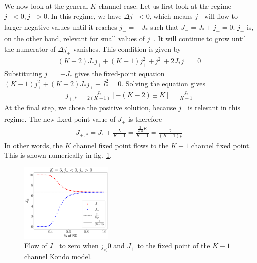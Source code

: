 \documentclass[reprint,prb,superscriptaddress]{revtex4-2}
\begin{document}
We now look at the general \(K\) channel case. Let us first look at the regime \(j_- < 0, j_+ > 0\). In this regime, we have \(\Delta j_- < 0\), which means \(j_-\) will flow to larger negative values until it reaches \(j_- = -J_*\) such that \(J_- = J_* + j_- = 0\). \(j_+\) is, on the other hand, relevant for small values of \(j_\pm\). It will continue to grow until the numerator of \(\Delta j_+\) vanishes. This condition is given by
\begin{align}
	\left(K - 2\right)J_*j_+ + (K-1)j_+^2 + j_-^2 + 2J_* j_- = 0
\end{align}
Substituting \(j_- = -J_*\) gives the fixed-point equation \((K-1)j_+^2 + \left(K - 2\right)J_*j_+ - J_*^2 = 0\). Solving the equation gives
\begin{align}
	j_{+,*} = \frac{J_*}{2(K-1)}\left[-(K-2) \pm K\right] = \frac{J_*}{K-1}
\end{align}
At the final step, we chose the positive solution, because \(j_+\) is relevant in this regime. The new fixed point value of \(J_+\) is therefore
\begin{align}
	J_{+,*} = J_* + \frac{J_*}{K-1} = \frac{\frac{2}{K \rho} K}{K - 1} = \frac{2}{(K-1)\rho}
\end{align}
In other words, the \(K\) channel fixed point flows to the \(K-1\) channel fixed point. This is shown numerically in fig.~\ref{K_to_K-1}.

\begin{figure}[htpb]
	\centering
	\includegraphics[width=0.4\textwidth]{../numerics/K to K-1.pdf}
	\caption{Flow of \(J_-\) to zero when \(j_< 0\) and \(J_+\) to the fixed point of the \(K-1\) channel Kondo model.}
	\label{K_to_K-1}
\end{figure}
\end{document}
